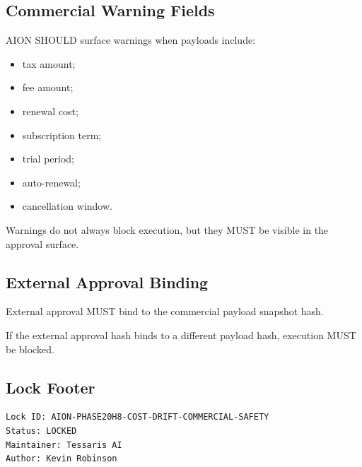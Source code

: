 \subsection{Commercial Warning Fields}

AION SHOULD surface warnings when payloads include:

\begin{itemize}
  \item tax amount;
  \item fee amount;
  \item renewal cost;
  \item subscription term;
  \item trial period;
  \item auto-renewal;
  \item cancellation window.
\end{itemize}

Warnings do not always block execution, but they MUST be visible in the approval surface.

\subsection{External Approval Binding}

External approval MUST bind to the commercial payload snapshot hash.

If the external approval hash binds to a different payload hash, execution MUST be blocked.

\subsection{Lock Footer}

\begin{verbatim}
Lock ID: AION-PHASE20H8-COST-DRIFT-COMMERCIAL-SAFETY
Status: LOCKED
Maintainer: Tessaris AI
Author: Kevin Robinson
\end{verbatim}
